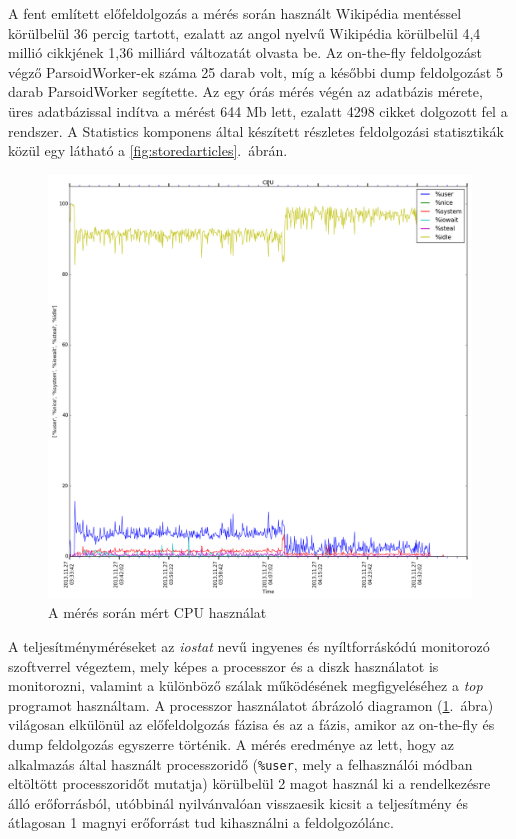 A fent említett előfeldolgozás a mérés során használt Wikipédia mentéssel körülbelül 36 percig tartott, ezalatt az angol nyelvű Wikipédia körülbelül 4,4 millió cikkjének 1,36 milliárd változatát olvasta be. Az on-the-fly feldolgozást végző ParsoidWorker-ek száma 25 darab volt, míg a későbbi dump feldolgozást 5 darab ParsoidWorker segítette. Az egy órás mérés végén az adatbázis mérete, üres adatbázissal indítva a mérést 644 Mb lett, ezalatt 4298 cikket dolgozott fel a rendszer. A Statistics komponens által készített részletes feldolgozási statisztikák közül egy látható a \ref{fig:storedarticles}.~ábrán.

\begin{figure}[htb]
\centering
\includegraphics[scale=0.3]{img/measurement_cpu}
\caption{A mérés során mért CPU használat}
\label{fig:measurement_cpu}
\end{figure}

A teljesítményméréseket az \textit{iostat} nevű ingyenes és nyíltforráskódú monitorozó szoftverrel végeztem, mely képes a processzor és a diszk használatot is monitorozni, valamint a különböző szálak működésének megfigyeléséhez a \textit{top} programot használtam. A processzor használatot ábrázoló diagramon (\ref{fig:measurement_cpu}.~ábra) világosan elkülönül az előfeldolgozás fázisa és az a fázis, amikor az on-the-fly és dump feldolgozás egyszerre történik. A mérés eredménye az lett, hogy az alkalmazás által használt processzoridő (\texttt{\%user}, mely a felhasználói módban eltöltött processzoridőt mutatja) körülbelül 2 magot használ ki a rendelkezésre álló erőforrásból, utóbbinál nyilvánvalóan visszaesik kicsit a teljesítmény és átlagosan 1 magnyi erőforrást tud kihasználni a feldolgozólánc.

